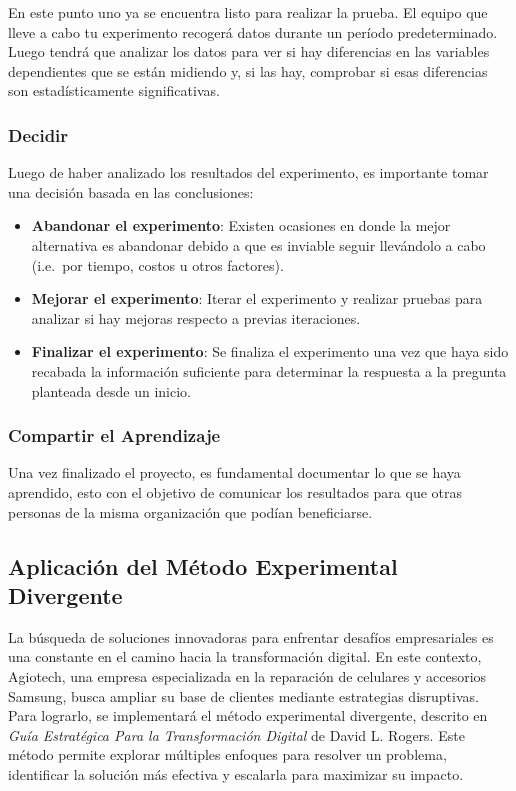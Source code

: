 En este punto uno ya se encuentra listo para realizar la prueba. El equipo que
lleve a cabo tu experimento recogerá datos durante un período predeterminado. Luego
tendrá que analizar los datos para ver si hay diferencias en las variables dependientes
que se están midiendo y, si las hay, comprobar si esas diferencias son estadísticamente
significativas.

\subsubsection{Decidir}

Luego de haber analizado los resultados del experimento, es importante tomar una
decisión basada en las conclusiones:

\begin{itemize}
	\item \textbf{Abandonar el experimento}: Existen ocasiones en donde la mejor alternativa
	      es abandonar debido a que es inviable seguir llevándolo a cabo (i.e.~por tiempo,
	      costos u otros factores).

	\item \textbf{Mejorar el experimento}: Iterar el experimento y realizar pruebas
	      para analizar si hay mejoras respecto a previas iteraciones.

	\item \textbf{Finalizar el experimento}: Se finaliza el experimento una vez que
	      haya sido recabada la información suficiente para determinar la respuesta a la
	      pregunta planteada desde un inicio.
\end{itemize}

\subsubsection{Compartir el Aprendizaje}

Una vez finalizado el proyecto, es fundamental documentar lo que se haya
aprendido, esto con el objetivo de comunicar los resultados para que otras personas
de la misma organización que podían beneficiarse.

\subsection{Aplicación del Método Experimental Divergente}

La búsqueda de soluciones innovadoras para enfrentar desafíos empresariales es
una constante en el camino hacia la transformación digital. En este contexto,
Agiotech, una empresa especializada en la reparación de celulares y accesorios Samsung,
busca ampliar su base de clientes mediante estrategias disruptivas. Para lograrlo,
se implementará el método experimental divergente, descrito en \emph{Guía
	Estratégica Para la Transformación Digital} de David L. Rogers. Este método
permite explorar múltiples enfoques para resolver un problema, identificar la solución
más efectiva y escalarla para maximizar su impacto.

